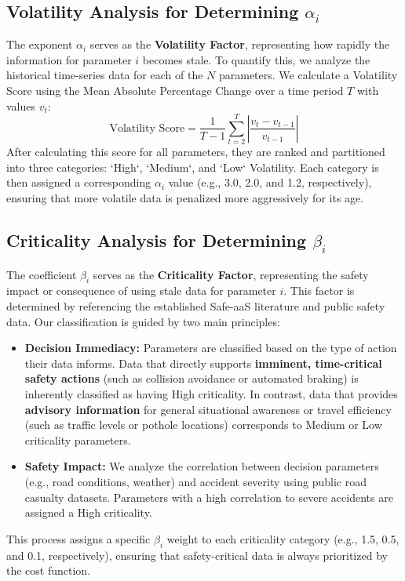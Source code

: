 \documentclass[journal]{IEEEtran}
\begin{document}
\subsection{Volatility Analysis for Determining $\alpha_i$}
The exponent $\alpha_i$ serves as the \textbf{Volatility Factor}, representing how rapidly the information for parameter $i$ becomes stale. To quantify this, we analyze the historical time-series data for each of the $N$ parameters. We calculate a Volatility Score using the Mean Absolute Percentage Change over a time period $T$ with values $v_t$:
\begin{equation}
    \text{Volatility Score} = \frac{1}{T-1} \sum_{t=2}^{T} \left| \frac{v_t - v_{t-1}}{v_{t-1}} \right|
\end{equation}
After calculating this score for all parameters, they are ranked and partitioned into three categories: `High`, `Medium`, and `Low` Volatility. Each category is then assigned a corresponding $\alpha_i$ value (e.g., 3.0, 2.0, and 1.2, respectively), ensuring that more volatile data is penalized more aggressively for its age.

\subsection{Criticality Analysis for Determining $\beta_i$}
The coefficient $\beta_i$ serves as the \textbf{Criticality Factor}, representing the safety impact or consequence of using stale data for parameter $i$. This factor is determined by referencing the established Safe-aaS literature and public safety data. 
Our classification is guided by two main principles:
\begin{itemize}
    \item \textbf{Decision Immediacy:} Parameters are classified based on the type of action their data informs. Data that directly supports \textbf{imminent, time-critical safety actions} (such as collision avoidance or automated braking) is inherently classified as having High criticality. In contrast, data that provides \textbf{advisory information} for general situational awareness or travel efficiency (such as traffic levels or pothole locations) corresponds to Medium or Low criticality parameters.
    \item \textbf{Safety Impact:} We analyze the correlation between decision parameters (e.g., road conditions, weather) and accident severity using public road casualty datasets. Parameters with a high correlation to severe accidents are assigned a High criticality.
\end{itemize}
This process assigns a specific $\beta_i$ weight to each criticality category (e.g., 1.5, 0.5, and 0.1, respectively), ensuring that safety-critical data is always prioritized by the cost function.
\end{document}
